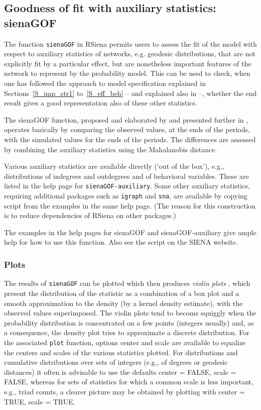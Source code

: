 \documentclass[a4paper,fleqn,11pt]{article}
\newcommand{\+}{\, + \,}
\newcommand{\sfn}[1]{\textsf{#1}}
\newcommand{\RS}{{\sf RSiena }}
\newcommand{\SI}{{\sf SIENA }}
\begin{document}
\subsection{Goodness of fit with auxiliary statistics: \sfn{sienaGOF}}
\label{S_gof}

The function  \verb!sienaGOF! in \RS permits users
to assess the fit of the model with respect to
auxiliary statistics of networks, e.g. geodesic distributions,
that are not explicitly fit by a particular effect,
but are nonetheless important features of the network to represent by the
probability model.
This can be used to check, when one has followed the approach to
model specification explained in Sections~\ref{S_imp_str1}
to~\ref{S_eff_beh} -- and explained also in \citet{SnijdersEA10b} --,
whether the end result gives a good representation
also of these other statistics.

The \sfn{sienaGOF} function, proposed and elaborated by
\citet{Lospinoso2012} and presented further
in \citet{LospinosoSnijders2019}, operates basically by comparing
the observed values, at the ends of the periods, with the
simulated values for the ends of the periods.
The differences are assessed by combining the auxiliary statistics
using the Mahalanobis distance.

Various auxiliary statistics are available directly (`out of the box'),
e.g., distributions of indegrees and outdegrees and of behavioral
variables. These are listed in the help page for
\verb!sienaGOF-auxiliary!. Some other auxiliary statistics, requiring
additional packages such as \texttt{igraph} and \texttt{sna},
are available by copying script from the examples in the same help page.
(The reason for this construction is to reduce dependencies
of \RS on other packages.)

The examples in the help pages for \sfn{sienaGOF} and \sfn{sienaGOF-auxiliary}
give ample help for how to use this function.
Also see the script on the \SI website.


\subsubsection{Plots}
The results of \verb!sienaGOF! can be plotted which then produces
\emph{violin plots} \citep{HintzeNelson1998}, which present
the distribution of the statistic as a combination
of a box plot and a smooth approximation to the density
(by a kernel density estimate), with the observed values superimposed.
The violin plots tend to become squiggly when the probability distribution
is concentrated on a few points (integers usually) and, as a consequence,
the density plot tries to approximate a discrete distribution.
For the associated \verb!plot! function, options \sfn{center} and \sfn{scale}
are available to equalize the centers and scales of the various statistics
plotted.
For distributions and cumulative distributions over sets of integers
(e.g., of degrees or geodesic distances)
it often is advisable to use the defaults \sfn{center = FALSE},
\sfn{scale = FALSE}, whereas for sets of statistics for which a common scale
is less important, e.g., triad counts, a clearer picture may be obtained by
plotting with \sfn{center = TRUE}, \sfn{scale = TRUE}.
\end{document}
